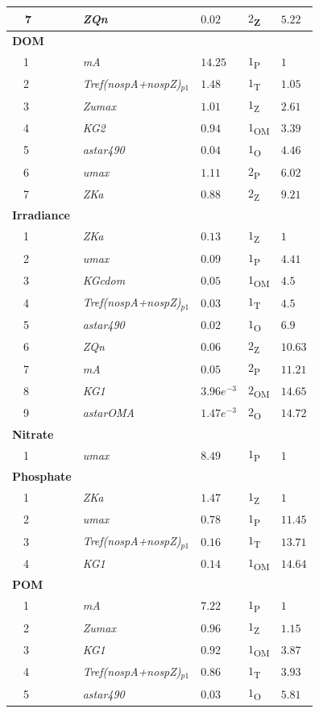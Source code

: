 \documentclass[review]{elsarticle}\usepackage[]{graphicx}\usepackage[]{color}
\begin{document}
\begin{table}[!tbp]
{\begin{center}
\begin{tabular}{lllll}
~~7&\scriptsize{\textit{ZQn}}&$0.02$&$2$\textsubscript{Z}&$5.22$\tabularnewline
\hline
{\bfseries DOM}&&&&\tabularnewline
~~1&\scriptsize{\textit{mA}}&$14.25$&$1$\textsubscript{P}&$1$\tabularnewline
~~2&\scriptsize{\textit{Tref(nospA+nospZ)$_{p1}$}}&$1.48$&$1$\textsubscript{T}&$1.05$\tabularnewline
~~3&\scriptsize{\textit{Zumax}}&$1.01$&$1$\textsubscript{Z}&$2.61$\tabularnewline
~~4&\scriptsize{\textit{KG2}}&$0.94$&$1$\textsubscript{OM}&$3.39$\tabularnewline
~~5&\scriptsize{\textit{astar490}}&$0.04$&$1$\textsubscript{O}&$4.46$\tabularnewline
~~6&\scriptsize{\textit{umax}}&$1.11$&$2$\textsubscript{P}&$6.02$\tabularnewline
~~7&\scriptsize{\textit{ZKa}}&$0.88$&$2$\textsubscript{Z}&$9.21$\tabularnewline
\hline
{\bfseries Irradiance}&&&&\tabularnewline
~~1&\scriptsize{\textit{ZKa}}&$0.13$&$1$\textsubscript{Z}&$1$\tabularnewline
~~2&\scriptsize{\textit{umax}}&$0.09$&$1$\textsubscript{P}&$4.41$\tabularnewline
~~3&\scriptsize{\textit{KGcdom}}&$0.05$&$1$\textsubscript{OM}&$4.5$\tabularnewline
~~4&\scriptsize{\textit{Tref(nospA+nospZ)$_{p1}$}}&$0.03$&$1$\textsubscript{T}&$4.5$\tabularnewline
~~5&\scriptsize{\textit{astar490}}&$0.02$&$1$\textsubscript{O}&$6.9$\tabularnewline
~~6&\scriptsize{\textit{ZQn}}&$0.06$&$2$\textsubscript{Z}&$10.63$\tabularnewline
~~7&\scriptsize{\textit{mA}}&$0.05$&$2$\textsubscript{P}&$11.21$\tabularnewline
~~8&\scriptsize{\textit{KG1}}&$3.96e^{-3}$&$2$\textsubscript{OM}&$14.65$\tabularnewline
~~9&\scriptsize{\textit{astarOMA}}&$1.47e^{-3}$&$2$\textsubscript{O}&$14.72$\tabularnewline
\hline
{\bfseries Nitrate}&&&&\tabularnewline
~~1&\scriptsize{\textit{umax}}&$8.49$&$1$\textsubscript{P}&$1$\tabularnewline
\hline
{\bfseries Phosphate}&&&&\tabularnewline
~~1&\scriptsize{\textit{ZKa}}&$1.47$&$1$\textsubscript{Z}&$1$\tabularnewline
~~2&\scriptsize{\textit{umax}}&$0.78$&$1$\textsubscript{P}&$11.45$\tabularnewline
~~3&\scriptsize{\textit{Tref(nospA+nospZ)$_{p1}$}}&$0.16$&$1$\textsubscript{T}&$13.71$\tabularnewline
~~4&\scriptsize{\textit{KG1}}&$0.14$&$1$\textsubscript{OM}&$14.64$\tabularnewline
\hline
{\bfseries POM}&&&&\tabularnewline
~~1&\scriptsize{\textit{mA}}&$7.22$&$1$\textsubscript{P}&$1$\tabularnewline
~~2&\scriptsize{\textit{Zumax}}&$0.96$&$1$\textsubscript{Z}&$1.15$\tabularnewline
~~3&\scriptsize{\textit{KG1}}&$0.92$&$1$\textsubscript{OM}&$3.87$\tabularnewline
~~4&\scriptsize{\textit{Tref(nospA+nospZ)$_{p1}$}}&$0.86$&$1$\textsubscript{T}&$3.93$\tabularnewline
~~5&\scriptsize{\textit{astar490}}&$0.03$&$1$\textsubscript{O}&$5.81$\tabularnewline
\hline
\end{tabular}\end{center}}
\end{table}
\end{document}
